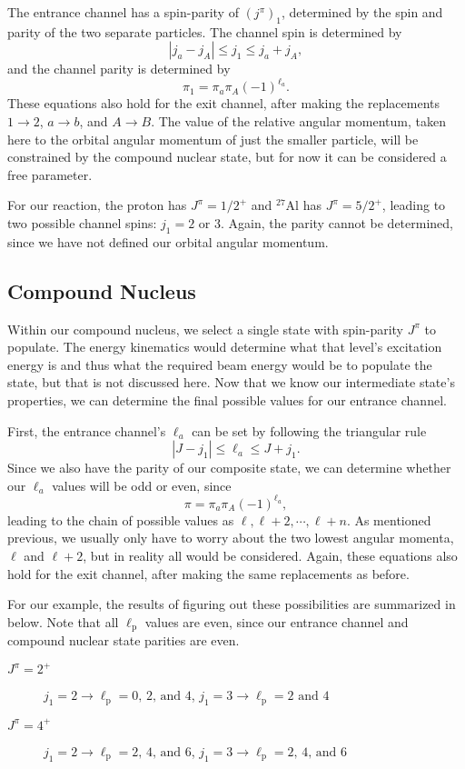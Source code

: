 \documentclass[10pt]{amsart}
\numberwithin{equation}{subsection}
\newcommand{\nuc}[2]{${}^{#1}\textrm{#2}$}
\begin{document}
The entrance channel has a spin-parity of $(j^{\pi})_1$, determined by the spin
and parity of the two separate particles. The channel spin is determined by
\[
    |j_a - j_A| \leq j_1 \leq j_a + j_A,
\]
and the channel parity is determined by
\[
    \pi_1 = \pi_a\pi_A(-1)^{\ell_a}.
\]
These equations also hold for the exit channel, after making the replacements
$1\rightarrow2$, $a\rightarrow b$, and $A\rightarrow B$. The value of the
relative angular momentum, taken here to the orbital angular momentum of just
the smaller particle, will be constrained by the compound nuclear state, but
for now it can be considered a free parameter.

For our reaction, the proton has $J^{\pi} = 1/2^+$ and \nuc{27}{Al} has
$J^{\pi} = 5/2^+$, leading to two possible channel spins:
$j_1 = 2$ or 3. Again, the parity cannot be determined, since we have not
defined our orbital angular momentum.


\subsection{Compound Nucleus}

Within our compound nucleus, we select a single state with spin-parity
$J^{\pi}$ to populate. The energy kinematics would determine what that level's
excitation energy is and thus what the required beam energy would be to
populate the state, but that is not discussed here. Now that we know our
intermediate state's properties, we can determine the final possible values
for our entrance channel.

First, the entrance channel's $\ell_a$ can be set by following the triangular
rule
\[
    |J - j_1| \leq \ell_a \leq J + j_1.
\]
Since we also have the parity of our composite state, we can determine whether
our $\ell_a$ values will be odd or even, since
\[
    \pi = \pi_a\pi_A(-1)^{\ell_a},
\]
leading to the chain of possible values as $\ell, \ell + 2, \dotsb, \ell + n$.
As mentioned previous, we usually only have to worry about the two lowest
angular momenta, $\ell$ and $\ell + 2$, but in reality all would be considered.
Again, these equations also hold for the exit channel, after making the same
replacements as before.

For our example, the results of figuring out these possibilities are summarized
in below. Note that all $\ell_{\textrm{p}}$ values are even, since our entrance
channel and compound nuclear state parities are even.

\begin{description}
    \item[$J^{\pi} = 2^+$]
        $j_1 = 2 \rightarrow \ell_{\textrm{p}} = 0\textrm{, }2\textrm{, and }4$,
        $j_1 = 3 \rightarrow \ell_{\textrm{p}} = 2\textrm{ and }4$
    \item[$J^{\pi} = 4^+$]
        $j_1 = 2 \rightarrow \ell_{\textrm{p}} = 2\textrm{, }4\textrm{, and }6$,
        $j_1 = 3 \rightarrow \ell_{\textrm{p}} = 2\textrm{, }4\textrm{, and }6$
\end{description}
\end{document}
